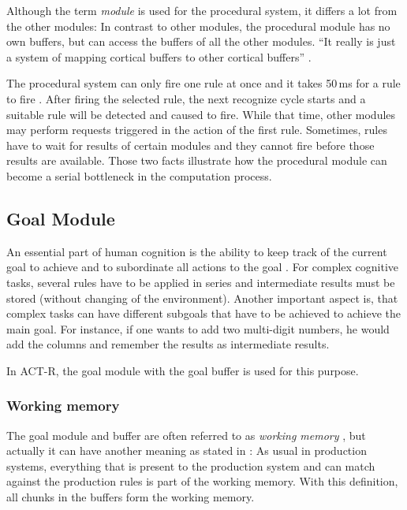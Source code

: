 Although the term \emph{module} is used for the procedural system, it differs a lot from the other modules: In contrast to other modules, the procedural module has no own buffers, but can access the buffers of all the other modules. ``It really is just a system of mapping cortical buffers to other cortical buffers'' \cite[p. 54]{anderson_how_2007}.

The procedural system can only fire one rule at once and it takes 50\,ms for a rule to fire \cite[p. 54]{anderson_how_2007}. After firing the selected rule, the next recognize cycle starts and a suitable rule will be detected and caused to fire. While that time, other modules may perform requests triggered in the action of the first rule. Sometimes, rules have to wait for results of certain modules and they cannot fire before those results are available. Those two facts illustrate how the procedural module can become a serial bottleneck in the computation process.

\subsection{Goal Module}

An essential part of human cognition is the ability to keep track of the current goal to achieve and to subordinate all actions to the goal \cite[p. 1041]{anderson_integrated_2004}. For complex cognitive tasks, several rules have to be applied in series and intermediate results must be stored (without changing of the environment). Another important aspect is, that complex tasks can have different subgoals that have to be achieved to achieve the main goal. For instance, if one wants to add two multi-digit numbers, he would add the columns and remember the results as intermediate results.

In ACT-R, the goal module with the goal buffer is used for this purpose. 

\subsubsection{Working memory}

The goal module and buffer are often referred to as \emph{working memory} \cite[p. 1041]{anderson_integrated_2004}, but actually it can have another meaning as stated in \cite{anderson_working_1996}: As usual in production systems, everything that is present to the production system and can match against the production rules is part of the working memory. With this definition, all chunks in the buffers form the working memory.

